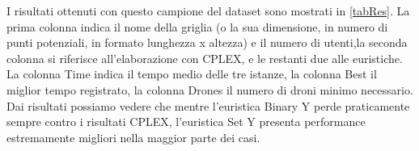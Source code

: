 I risultati ottenuti con questo campione del dataset sono mostrati in \tablename \ref{tabRes}. La prima colonna indica il nome della griglia (o la sua dimensione, in numero di punti potenziali, in formato lunghezza x altezza) e il numero di utenti,la seconda colonna si riferisce all'elaborazione con CPLEX, e le restanti due alle euristiche. La colonna Time indica il tempo medio delle tre istanze, la colonna Best il miglior tempo registrato, la colonna Drones il numero di droni minimo necessario.  \\
Dai risultati possiamo vedere che mentre l'euristica Binary Y perde praticamente sempre contro i risultati CPLEX, l'euristica Set Y presenta performance estremamente migliori nella maggior parte dei casi. \\  

\setlength{\tabcolsep}{3.5 pt}
\renewcommand\arraystretch{1.1}
